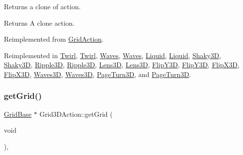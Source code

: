 Returns a clone of action.

\begin{DoxyReturn}{Returns}
A clone action. 
\end{DoxyReturn}


Reimplemented from \hyperlink{classGridAction_a081a9340e9289cf2dcbb6bde121d4f24}{Grid\+Action}.



Reimplemented in \hyperlink{classTwirl_a9121ce0fe151b7f7224caab88f688aab}{Twirl}, \hyperlink{classTwirl_a49ec654e932aa851844dac90fa0cc65c}{Twirl}, \hyperlink{classWaves_a9da6486c1749a9e6cb8966a45897a077}{Waves}, \hyperlink{classWaves_a4d92fc4a2d0d52f24310b4b9df4ae547}{Waves}, \hyperlink{classLiquid_a18fdff260e28b3bb195563cd8e60fdc3}{Liquid}, \hyperlink{classLiquid_ae1ca20f6c336cad86c748c547d1b4420}{Liquid}, \hyperlink{classShaky3D_adaf0dbadf0e32fab853579c4b8df966b}{Shaky3D}, \hyperlink{classShaky3D_a419f771e52c23750ac4eab5808b76b1b}{Shaky3D}, \hyperlink{classRipple3D_a79b0876958a8e7403d8be5f6e2adfd24}{Ripple3D}, \hyperlink{classRipple3D_a704ef078cca9cde6c85acbcd8e11cc4e}{Ripple3D}, \hyperlink{classLens3D_ad628edf64ecd2f4fe17a6ae7530cf2b7}{Lens3D}, \hyperlink{classLens3D_a7b97fe4349267d8a3a7404e8bc19aa33}{Lens3D}, \hyperlink{classFlipY3D_a4553fc238ade03f1926ba12458ad073b}{Flip\+Y3D}, \hyperlink{classFlipY3D_a797e0c0669bd83473d66dc8d77d49daa}{Flip\+Y3D}, \hyperlink{classFlipX3D_a82c67645ce0cfa6435a7266c00359a94}{Flip\+X3D}, \hyperlink{classFlipX3D_a3c8f037e07f76fbccb63a960c763a947}{Flip\+X3D}, \hyperlink{classWaves3D_a7f9f49bce0ebd46fc200d208a984b5bf}{Waves3D}, \hyperlink{classWaves3D_ab41b6156741e145fbd6c3626bc16ec25}{Waves3D}, \hyperlink{classPageTurn3D_a4679e461471010cd87932c11be5bef9a}{Page\+Turn3D}, and \hyperlink{classPageTurn3D_a98aa1300a97553c4f4185d974021bdc4}{Page\+Turn3D}.

\mbox{\label{classGrid3DAction_ad68b52ba318636b43a4c7aab0a9c2887}} 
\subsubsection{\texorpdfstring{get\+Grid()}{getGrid()}\hspace{0.1cm}{\footnotesize\ttfamily [1/2]}}
{\footnotesize\ttfamily \hyperlink{classGridBase}{Grid\+Base} $\ast$ Grid3\+D\+Action\+::get\+Grid (\begin{DoxyParamCaption}\item[{void}]{ }\end{DoxyParamCaption})\hspace{0.3cm}{\ttfamily [override]}, {\ttfamily [virtual]}}



